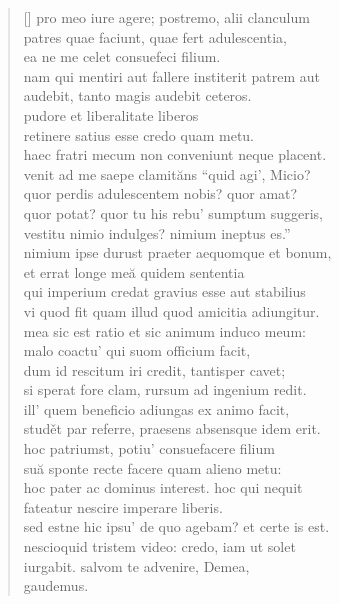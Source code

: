 \begin{verse}[\versewidth]
    pro meo iure agere; postremo, alii clanculum\\
    patres quae faciunt, quae fert adulescentia,\\
    ea ne me celet consuefeci filium.\\
    nam qui mentiri aut fallere institerit patrem aut\\
    audebit, tanto magis audebit ceteros.\\
    pudore et liberalitate liberos\\
    retinere satius esse credo quam metu.\\
    haec fratri mecum non conveniunt neque placent.\\
    venit ad me saepe clamităns ``quid agi', Micio?\\
    quor perdis adulescentem nobis? quor amat?\\
    quor potat? quor tu his rebu' sumptum suggeris,\\
    vestitu nimio indulges? nimium ineptus es.''\\
    nimium ipse durust praeter aequomque et bonum,\\
    et errat longe meă quidem sententia\\
    qui imperium credat gravius esse aut stabilius\\
    vi quod fit quam illud quod amicitia adiungitur.\\
    mea sic est ratio et sic animum induco meum:\\
    malo coactu' qui suom officium facit,\\
    dum id rescitum iri credit, tantisper cavet;\\
    si sperat fore clam, rursum ad ingenium redit.\\
    ill' quem beneficio adiungas ex animo facit,\\
    studět par referre, praesens absensque idem erit.\\
    hoc patriumst, potiu' consuefacere filium\\
    suă sponte recte facere quam alieno metu:\\
    hoc pater ac dominus interest. hoc qui nequit\\
    fateatur nescire imperare liberis.\\
    sed estne hic ipsu' de quo agebam? et certe is est.\\
    nescioquid tristem video: credo, iam ut solet\\
    iurgabit. salvom te advenire, Demea,\\
    gaudemus.\\
\end{verse}

